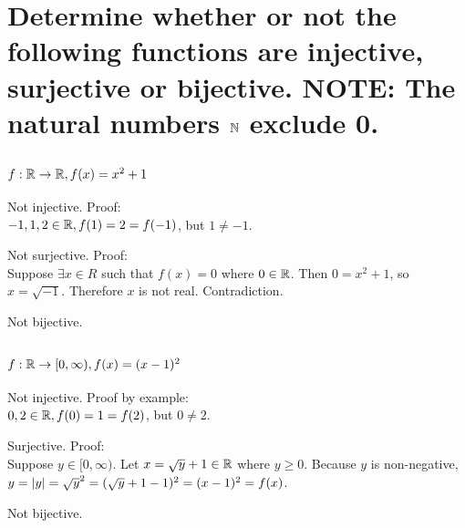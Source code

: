 \section{Determine whether or not the following functions are injective, surjective or bijective.
    NOTE: The natural numbers $\mathbb{N}$ exclude 0.}
    \begin{multicols}{2}
        \subsection{$f: \mathbb{R} \to \mathbb{R} , f(x) = x^2 + 1$}
            Not injective. Proof: \\ 
                $-1, 1, 2 \in \mathbb{R}, f(1) = 2 = f(-1)$, but $1 \neq -1$.

            Not surjective. Proof: \\ 
                Suppose $\exists x \in R$ such that $f(x) = 0$ where $0 \in \mathbb{R}$.
                Then $0 = x^2 + 1$, so $x = \sqrt{-1}$.
                Therefore $x$ is not real.
                Contradiction.

            Not bijective.

        \subsection{$f: \mathbb{R} \to [ 0, \infty), f(x) = (x-1)^2$}
            Not injective. Proof by example: \\ 
                $0, 2 \in \mathbb{R}, f(0) = 1 = f(2)$, but $0 \neq 2$.

            Surjective. Proof: \\ 
                Suppose $y \in [0, \infty)$.
                Let $x = \sqrt{y} + 1 \in \mathbb{R}$ where $y \geq 0$.
                Because $y$ is non-negative, 
                    $y 
                    = \left|y\right| 
                    = \sqrt{y}^2
                    = (\sqrt{y} + 1 - 1)^2
                    = (x - 1)^2 
                    = f(x)$.

            Not bijective.
            
    \end{multicols}

